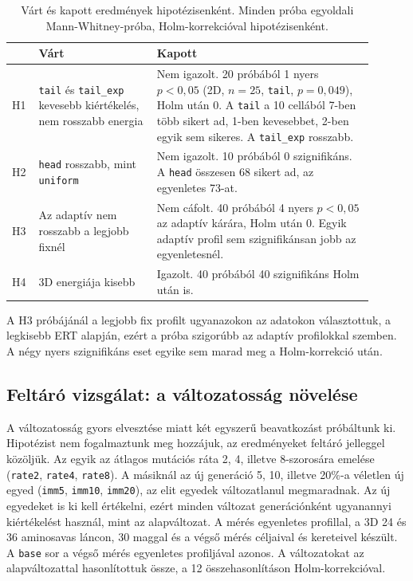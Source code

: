 \documentclass[11pt,a4paper]{article}
\begin{document}
\begin{table}[H]
\centering
\small
\begin{tabular}{p{0.05\linewidth}p{0.30\linewidth}p{0.55\linewidth}}
\toprule
 & Várt & Kapott \\
\midrule
H1 & \texttt{tail} és \texttt{tail\_exp} kevesebb kiértékelés, nem rosszabb energia & Nem igazolt. 20 próbából 1 nyers $p<0{,}05$ (2D, $n=25$, \texttt{tail}, $p=0{,}049$), Holm után 0. A \texttt{tail} a 10 cellából 7-ben több sikert ad, 1-ben kevesebbet, 2-ben egyik sem sikeres. A \texttt{tail\_exp} rosszabb. \\
H2 & \texttt{head} rosszabb, mint \texttt{uniform} & Nem igazolt. 10 próbából 0 szignifikáns. A \texttt{head} összesen 68 sikert ad, az egyenletes 73-at. \\
H3 & Az adaptív nem rosszabb a legjobb fixnél & Nem cáfolt. 40 próbából 4 nyers $p<0{,}05$ az adaptív kárára, Holm után 0. Egyik adaptív profil sem szignifikánsan jobb az egyenletesnél. \\
H4 & 3D energiája kisebb & Igazolt. 40 próbából 40 szignifikáns Holm után is. \\
\bottomrule
\end{tabular}
\caption{Várt és kapott eredmények hipotézisenként. Minden próba egyoldali
Mann-Whitney-próba, Holm-korrekcióval hipotézisenként.}
\end{table}

A H3 próbájánál a legjobb fix profilt ugyanazokon az adatokon választottuk, a
legkisebb ERT alapján, ezért a próba szigorúbb az adaptív profilokkal szemben. A
négy nyers szignifikáns eset egyike sem marad meg a Holm-korrekció után.

\subsection{Feltáró vizsgálat: a változatosság növelése}

A változatosság gyors elvesztése miatt két egyszerű beavatkozást próbáltunk ki.
Hipotézist nem fogalmaztunk meg hozzájuk, az eredményeket feltáró jelleggel
közöljük. Az egyik az átlagos mutációs ráta 2, 4, illetve 8-szorosára emelése
(\texttt{rate2}, \texttt{rate4}, \texttt{rate8}). A másiknál az új generáció 5, 10,
illetve 20\%-a véletlen új egyed (\texttt{imm5}, \texttt{imm10}, \texttt{imm20}),
az elit egyedek változatlanul megmaradnak. Az új egyedeket is ki kell értékelni,
ezért minden változat generációnként ugyanannyi kiértékelést használ, mint az
alapváltozat. A mérés egyenletes profillal, a 3D 24 és 36 aminosavas láncon, 30
maggal és a végső mérés céljaival és kereteivel készült. A \texttt{base} sor a
végső mérés egyenletes profiljával azonos. A változatokat az alapváltozattal
hasonlítottuk össze, a 12 összehasonlításon Holm-korrekcióval.
\end{document}
